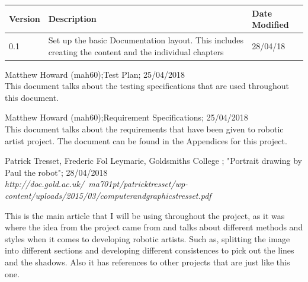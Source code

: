 \documentclass{article}
\begin{document}
\begin{center}

\begin{tabular}{| l | p{8cm} | p{3cm}|}

\hline

\textbf{Version} & \textbf{Description} & \textbf{Date Modified} \\\hline

0.1 & Set up the basic Documentation layout. This includes creating the content and the individual chapters & 28/04/18 \\ \hline


\end{tabular}

    \begin{thebibliography}{9}


    Matthew Howard (mah60);Test Plan; 25/04/2018 \\ 
    
    This document talks about the testing specifications that are used throughout this document.\\ 
    

    Matthew Howard (mah60);Requirement Specifications; 25/04/2018 \\ 
    
    This document talks about the requirements that have been given to robotic artist project. The document can be found in the Appendices for this project.\\ 
    

    Patrick Tresset, Frederic Fol Leymarie, Goldsmiths College ; "Portrait drawing by Paul the robot"; 28/04/2018 \\ 

    \textit{http://doc.gold.ac.uk/~ma701pt/patricktresset/wp-content/uploads/2015/03/computerandgraphicstresset.pdf}

This is the main article that I will be using throughout the project, as it was where the idea from the project came from and talks about different methods and styles when it comes to developing robotic artists. Such as, splitting the image into different sections and developing different consistences to pick out the lines and the shadows. Also it has references to other projects that are just like this one. 
 


\end{thebibliography}
\end{center}
\end{document}
